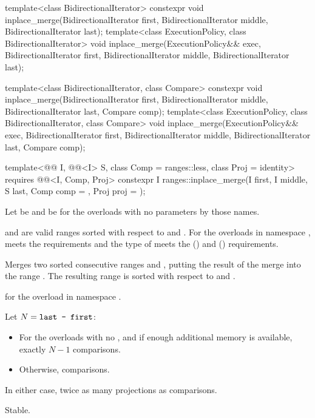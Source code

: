 %
\begin{itemdecl}
template<class BidirectionalIterator>
  constexpr void inplace_merge(BidirectionalIterator first,
                               BidirectionalIterator middle,
                               BidirectionalIterator last);
template<class ExecutionPolicy, class BidirectionalIterator>
  void inplace_merge(ExecutionPolicy&& exec,
                     BidirectionalIterator first,
                     BidirectionalIterator middle,
                     BidirectionalIterator last);

template<class BidirectionalIterator, class Compare>
  constexpr void inplace_merge(BidirectionalIterator first,
                               BidirectionalIterator middle,
                               BidirectionalIterator last, Compare comp);
template<class ExecutionPolicy, class BidirectionalIterator, class Compare>
  void inplace_merge(ExecutionPolicy&& exec,
                     BidirectionalIterator first,
                     BidirectionalIterator middle,
                     BidirectionalIterator last, Compare comp);

template<@@ I, @@<I> S, class Comp = ranges::less,
         class Proj = identity>
  requires @@<I, Comp, Proj>
  constexpr I ranges::inplace_merge(I first, I middle, S last, Comp comp = {}, Proj proj = {});
\end{itemdecl}

\begin{itemdescr}
\pnum
Let  be 
and  be 
for the overloads with no parameters by those names.

\pnum
\expects
{} and  are valid ranges
sorted with respect to  and .
For the overloads in namespace ,
 meets
the  requirements and
the type of  meets
the  () and
 () requirements.

\pnum
\effects
Merges two sorted consecutive ranges
 and ,
putting the result of the merge into the range .
The resulting range is sorted with respect to  and .

\pnum
\returns
{} for the overload in namespace .

\pnum
\complexity
Let $N = \texttt{\protect last - first}$:
\begin{itemize}
\item
  For the overloads with no , and
  if enough additional memory is available, exactly $N - 1$ comparisons.
\item
  Otherwise,  comparisons.
\end{itemize}
In either case, twice as many projections as comparisons.

\pnum
\remarks
Stable.
\end{itemdescr}

